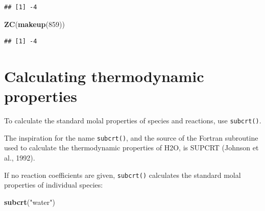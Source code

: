 \documentclass[]{tufte-book}
\newenvironment{Shaded}{}{}
\newcommand{\KeywordTok}[1]{\textcolor[rgb]{0.00,0.44,0.13}{\textbf{#1}}}
\newcommand{\DecValTok}[1]{\textcolor[rgb]{0.25,0.63,0.44}{#1}}
\newcommand{\StringTok}[1]{\textcolor[rgb]{0.25,0.44,0.63}{#1}}
\newcommand{\NormalTok}[1]{#1}
\begin{document}
\begin{verbatim}
## [1] -4
\end{verbatim}

\begin{Shaded}
\begin{Highlighting}[]
\KeywordTok{ZC}\NormalTok{(}\KeywordTok{makeup}\NormalTok{(}\DecValTok{859}\NormalTok{))}
\end{Highlighting}
\end{Shaded}

\begin{verbatim}
## [1] -4
\end{verbatim}

\chapter{Calculating thermodynamic
properties}\label{calculating-thermodynamic-properties}

To calculate the standard molal properties of species and reactions, use
{\texttt{subcrt()}}.

\begin{marginfigure}
The inspiration for the name {\texttt{subcrt()}}, and the source of the
Fortran subroutine used to calculate the thermodynamic properties of
H2O, is SUPCRT (Johnson et al., 1992).
\end{marginfigure}

\citeyearpar{JOH92} If no reaction coefficients are given,
{\texttt{subcrt()}} calculates the standard molal properties of
individual species:

\begin{Shaded}
\begin{Highlighting}[]
\KeywordTok{subcrt}\NormalTok{(}\StringTok{"water"}\NormalTok{)}
\end{Highlighting}
\end{Shaded}
\end{document}
